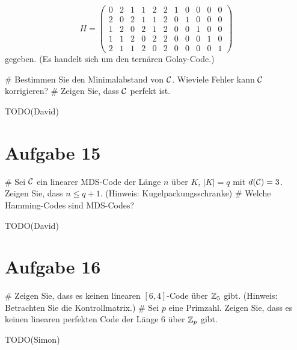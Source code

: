 \begin{equation*}
	H = 
	\begin{pmatrix}
	0 & 2 & 1 & 1 & 2 & 2 & 1 & 0 & 0 & 0 & 0 \\
	2 & 0 & 2 & 1 & 1 & 2 & 0 & 1 & 0 & 0 & 0 \\
	1 & 2 & 0 & 2 & 1 & 2 & 0 & 0 & 1 & 0 & 0 \\
	1 & 1 & 2 & 0 & 2 & 2 & 0 & 0 & 0 & 1 & 0 \\
	2 & 1 & 1 & 2 & 0 & 2 & 0 & 0 & 0 & 0 & 1
	\end{pmatrix}
\end{equation*}
gegeben.
(Es handelt sich um den ternären Golay-Code.)
\begin{myList}
#
Bestimmen Sie den Minimalabstand von $\mathcal{C}$.
Wieviele Fehler kann $\mathcal{C}$ korrigieren?
#
Zeigen Sie, dass $\mathcal{C}$ perfekt ist.
\end{myList}
TODO(David)

\section*{Aufgabe 15}
\begin{myList}
#
Sei $\mathcal{C}$ ein linearer MDS-Code der Länge $n$ über $K$, $|K| = q$ mit $d(\mathcal{C}) = 3$.
Zeigen Sie, dass $n \leq q + 1$.
(Hinweis: Kugelpackungsschranke)
#
Welche Hamming-Codes sind MDS-Codes?
\end{myList}
TODO(David)

\section*{Aufgabe 16}
\begin{myList}
#
Zeigen Sie, dass es keinen linearen $[6,4]$-Code über $\mathbb{Z}_5$ gibt.
(Hinweis: Betrachten Sie die Kontrollmatrix.)
#
Sei $p$ eine Primzahl.
Zeigen Sie, dass es keinen linearen perfekten Code der Länge 6 über $\mathbb{Z}_p$ gibt.
\end{myList}
TODO(Simon)







